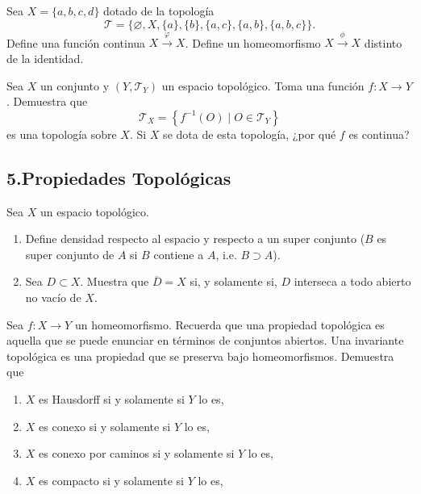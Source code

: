 \documentclass[b5paper,10pt,twoside]{book}
\begin{document}
\begin{problem}
Sea $X = \{a, b, c, d\}$ dotado de la topología
\[
\mathcal{T} = \{\varnothing, X, \{a\}, \{b\}, \{a, c\}, \{a, b\}, \{a, b, c\}\}.
\]
Define una función continua \(X\xrightarrow{\varphi} X\).
Define un homeomorfismo \(X\xrightarrow{\phi} X\) distinto de la identidad.
\end{problem}


\begin{problem}
Sea \(X\) un conjunto y 
\((Y,\mathcal{T}_Y)\) un espacio topológico.
Toma una función \(f\colon X\to Y\).
Demuestra que 
\[
\mathcal{T}_X = \left\{ 
    f^{-1}(O) \mid O\in \mathcal{T}_Y
 \right\}
\]
es una topología sobre \(X\).
Si \(X\) se dota de esta topología,
¿por qué \(f\) es continua?
\end{problem}








\subsection*{5.\enspace Propiedades Topológicas}



\begin{problem}
Sea \(X\)  un espacio topológico.
\begin{enumerate}[label=(\roman*)]
\item Define densidad respecto al espacio y respecto a un super conjunto (\(B\) es super conjunto de \(A\) si \(B\) contiene a \(A\), i.e. \(B\supset A\)).
\item Sea   \(D\subset X\). Muestra que \(\overline{D} = X\) si, y solamente si, \(D\) interseca a todo abierto no vacío de \(X\).
\end{enumerate}



\end{problem}

\begin{problem}
Sea \(f\colon X\to Y\)
un homeomorfismo.
Recuerda que una propiedad topológica es aquella que se puede enunciar en términos de 
conjuntos abiertos.
Una invariante topológica 
es una propiedad que se preserva bajo homeomorfismos.
Demuestra que 
\begin{enumerate}[label=(\roman*)]
\item  \(X\) es Hausdorff si y solamente si  \(Y\) lo es,
\item  \(X\) es conexo si y solamente si  \(Y\) lo es,
\item  \(X\) es conexo por caminos si y solamente si  \(Y\) lo es,
\item  \(X\) es compacto si y solamente si  \(Y\) lo es,
\end{enumerate}
\end{problem}
\end{document}
